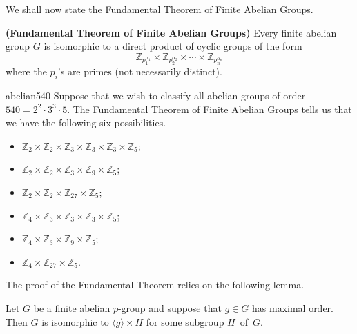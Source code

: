  
\medskip

We shall now state the Fundamental Theorem of Finite Abelian Groups. 
 
 
\begin{theorem}\label{struct:Finite_Abelian_Grps_Theorem}
\textbf{(Fundamental Theorem of Finite Abelian
Groups)} 
Every finite abelian group $G$ is isomorphic to a direct product of
cyclic groups of the form 
\[
{\mathbb Z}_{p_1^{ \alpha_1 }}
\times
{\mathbb Z}_{p_2^{ \alpha_2 }}
\times
\cdots
\times
{\mathbb Z}_{p_n^{ \alpha_n }}
\]
where the $p_i$'s are primes (not necessarily distinct).
\end{theorem}
 
 
\begin{example}{abelian540}
Suppose that we wish to classify all abelian groups of order $540=2^2
\cdot 3^3 \cdot 5$.  The Fundamental Theorem of Finite Abelian Groups 
tells us that we have the following six possibilities.
\begin{itemize}
 
\item
${\mathbb Z}_2 \times {\mathbb Z}_2 \times {\mathbb Z}_3
\times {\mathbb Z}_3 \times {\mathbb Z}_3 \times {\mathbb Z}_5$;
 
\item
${\mathbb Z}_2 \times {\mathbb Z}_2 \times {\mathbb Z}_3
\times {\mathbb Z}_9 \times {\mathbb Z}_5$;
 
 
\item
${\mathbb Z}_2 \times {\mathbb Z}_2
\times {\mathbb Z}_{27} \times {\mathbb Z}_5$;
 
 
\item
${\mathbb Z}_4 \times {\mathbb Z}_3
\times {\mathbb Z}_3 \times {\mathbb Z}_3 \times {\mathbb Z}_5$;
 
\item
${\mathbb Z}_4 \times {\mathbb Z}_3
\times {\mathbb Z}_9 \times {\mathbb Z}_5$;
 
\item
${\mathbb Z}_4 \times {\mathbb Z}_{27} \times {\mathbb Z}_5$.
 
\end{itemize}
\end{example}
 
The  proof of the Fundamental Theorem relies on the following lemma.

\begin{lemma}\label{struct:lemma:finite_abelian}
Let $G$ be a finite abelian $p$-group and suppose that $g \in G$ has
maximal order. Then $G$ is isomorphic to $\langle g \rangle \times H$
for some subgroup $H$~of~$G$. 
\end{lemma}

